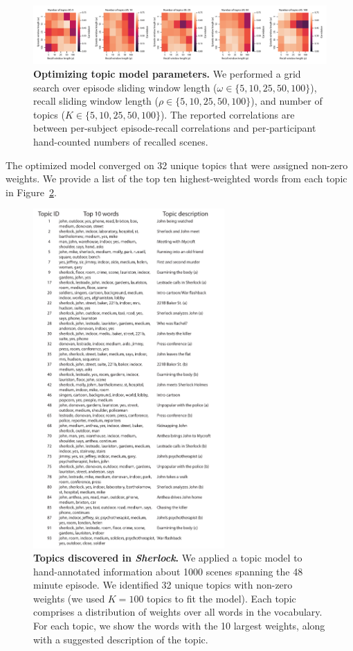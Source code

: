 \documentclass{article}
\begin{document}
\begin{figure}[b]
\centering
\includegraphics[width=1\textwidth]{figs/parameter_search}
\caption{\small \textbf{Optimizing topic model parameters.}  We performed a grid search over episode sliding window length ($\omega \in \{5, 10, 25, 50, 100 \}$), recall sliding window length ($\rho \in \{5, 10, 25, 50, 100 \}$), and number of topics ($K \in \{5, 10, 25, 50, 100 \}$).  The reported correlations are between per-subject episode-recall correlations and per-participant hand-counted numbers of recalled scenes.}
\label{fig:paramsearch}
\end{figure}

The optimized model converged on 32 unique topics that were assigned non-zero weights.  We provide a list of the top ten highest-weighted words from each topic in Figure~\ref{fig:topics}.

\begin{figure}[p]
\centering
\includegraphics[width=0.65\textwidth]{figs/topic_words}
\caption{\small \textbf{Topics discovered in \textit{Sherlock}.} We applied a topic model to hand-annotated information about 1000 scenes spanning the 48 minute episode.  We identified 32 unique topics with non-zero weights (we used $K=100$ topics to fit the model).  Each topic comprises a distribution of weights over all words in the vocabulary.  For each topic, we show the words with the 10 largest weights, along with a suggested description of the topic.}
\label{fig:topics}
\end{figure}
\end{document}
